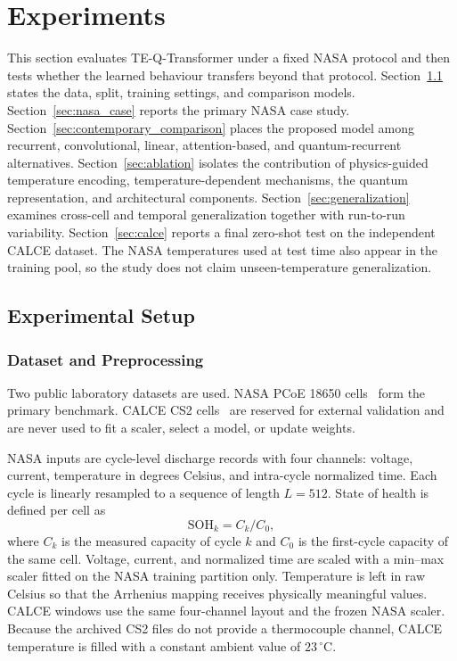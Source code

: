 \section{Experiments}\label{sec:experiments}\label{sec:results}

This section evaluates TE-Q-Transformer under a fixed NASA protocol and then tests whether the learned behaviour transfers beyond that protocol. Section~\ref{sec:experiment_setup} states the data, split, training settings, and comparison models. Section~\ref{sec:nasa_case} reports the primary NASA case study. Section~\ref{sec:contemporary_comparison} places the proposed model among recurrent, convolutional, linear, attention-based, and quantum-recurrent alternatives. Section~\ref{sec:ablation} isolates the contribution of physics-guided temperature encoding, temperature-dependent mechanisms, the quantum representation, and architectural components. Section~\ref{sec:generalization} examines cross-cell and temporal generalization together with run-to-run variability. Section~\ref{sec:calce} reports a final zero-shot test on the independent CALCE dataset. The NASA temperatures used at test time also appear in the training pool, so the study does not claim unseen-temperature generalization.

\subsection{Experimental Setup}
\label{sec:experiment_setup}

\subsubsection{Dataset and Preprocessing}
\label{sec:data_preprocess}

Two public laboratory datasets are used. NASA PCoE 18650 cells~\cite{saha2007battery} form the primary benchmark. CALCE CS2 cells~\citep{w9rg-7173-25} are reserved for external validation and are never used to fit a scaler, select a model, or update weights.

NASA inputs are cycle-level discharge records with four channels: voltage, current, temperature in degrees Celsius, and intra-cycle normalized time. Each cycle is linearly resampled to a sequence of length $L=512$. State of health is defined per cell as
\begin{equation}
\mathrm{SOH}_k = C_k / C_0,
\end{equation}
where $C_k$ is the measured capacity of cycle $k$ and $C_0$ is the first-cycle capacity of the same cell. Voltage, current, and normalized time are scaled with a min--max scaler fitted on the NASA training partition only. Temperature is left in raw Celsius so that the Arrhenius mapping receives physically meaningful values. CALCE windows use the same four-channel layout and the frozen NASA scaler. Because the archived CS2 files do not provide a thermocouple channel, CALCE temperature is filled with a constant ambient value of $23\,^\circ$C.

